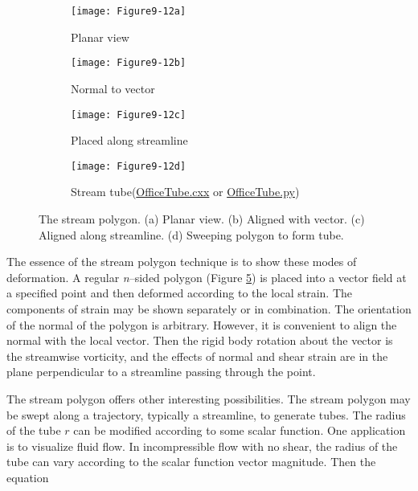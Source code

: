 \begin{figure}[htb]
	\begin{subfigure}[h]{0.48\linewidth}
		\texttt{[image: Figure9-12a]}
		\captionsetup{justification=centering}
		\caption{Planar view}
		\label{fig:Figure9-12a}
	\end{subfigure}
	\hfill
	\begin{subfigure}[h]{0.48\linewidth}
		\texttt{[image: Figure9-12b]}
		\captionsetup{justification=centering}
		\caption{Normal to vector}
		\label{fig:Figure9-12b}
	\end{subfigure}
	\hfill
	\begin{subfigure}[h]{0.48\linewidth}
		\texttt{[image: Figure9-12c]}
		\captionsetup{justification=centering}
		\caption{Placed along streamline}
		\label{fig:Figure9-12c}
	\end{subfigure}
	\hfill
		\begin{subfigure}[h]{0.48\linewidth}
		\texttt{[image: Figure9-12d]}
		\captionsetup{justification=centering}
		\caption{Stream tube(\href{https://lorensen.github.io/VTKExamples/site/Cxx/VisualizationAlgorithms/OfficeTube/}{OfficeTube.cxx} or \href{https://lorensen.github.io/VTKExamples/site/Python/VisualizationAlgorithms/OfficeTube/}{OfficeTube.py})}
		\label{fig:Figure9-12d}
	\end{subfigure}
	\caption{The stream polygon. (a) Planar view. (b) Aligned with vector. (c) Aligned along streamline. (d) Sweeping polygon to form tube.}\label{fig:Figure9-12}
\end{figure}

The essence of the stream polygon technique is to show these modes of deformation. A regular \emph{n}--sided polygon (Figure \ref{fig:Figure9-12}) is placed into a vector field at a specified point and then deformed according to the local strain. The components of strain may be shown separately or in combination. The orientation of the normal of the polygon is arbitrary. However, it is convenient to align the normal with the local vector. Then the rigid body rotation about the vector is the streamwise vorticity, and the effects of normal and shear strain are in the plane perpendicular to a streamline passing through the point.

The stream polygon offers other interesting possibilities. The stream polygon may be swept along a trajectory, typically a streamline, to generate tubes. The radius of the tube $r$ can be modified according to some scalar function. One application is to visualize fluid flow. In incompressible flow with no shear, the radius of the tube can vary according to the scalar function vector magnitude. Then the equation

